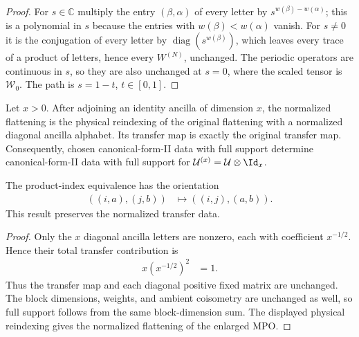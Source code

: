 \begin{proof}
    \leanok
    For $s\in\mathbb C$ multiply the entry $(\beta,\alpha)$ of every letter by
    $s^{w(\beta)-w(\alpha)}$; this is a polynomial in $s$ because the entries
    with $w(\beta)<w(\alpha)$ vanish. For $s\neq0$ it is the conjugation of
    every letter by $\operatorname{diag}(s^{w(\beta)})$, which leaves every
    trace of a product of letters, hence every $W^{(N)}$, unchanged. The
    periodic operators are continuous in $s$, so they are also unchanged at
    $s=0$, where the scaled tensor is $\mathcal W_0$. The path is $s=1-t$,
    $t\in[0,1]$.
\end{proof}

\begin{lemma}
    \label{thm:mpu_identity_ancilla_reduced_cfii}
    \leanok
    Let $x>0$. After adjoining an identity ancilla of dimension $x$, the
    normalized flattening is the physical reindexing of the original flattening
    with a normalized diagonal ancilla alphabet. Its transfer map is exactly the
    original transfer map. Consequently, chosen canonical-form-II data with full
    support determine canonical-form-II data with full support for
    $\mathcal U^{(x)}=\mathcal U\otimes\Id_x$.

    The product-index equivalence has the orientation
    \begin{align}
        ((i,a),(j,b)) & \longmapsto((i,j),(a,b)).
    \end{align}
    This result preserves the normalized transfer data.
\end{lemma}

\begin{proof}\leanok
    Only the $x$ diagonal ancilla letters are nonzero, each with coefficient
    $x^{-1/2}$. Hence their total transfer contribution is
    \begin{align}
        x\left(x^{-1/2}\right)^2 & =1.
    \end{align}
    Thus the transfer map and each diagonal positive fixed matrix are unchanged.
    The block dimensions, weights, and ambient coisometry are unchanged as well,
    so full support follows from the same block-dimension sum. The displayed
    physical reindexing gives the normalized flattening of the enlarged MPO.
\end{proof}

